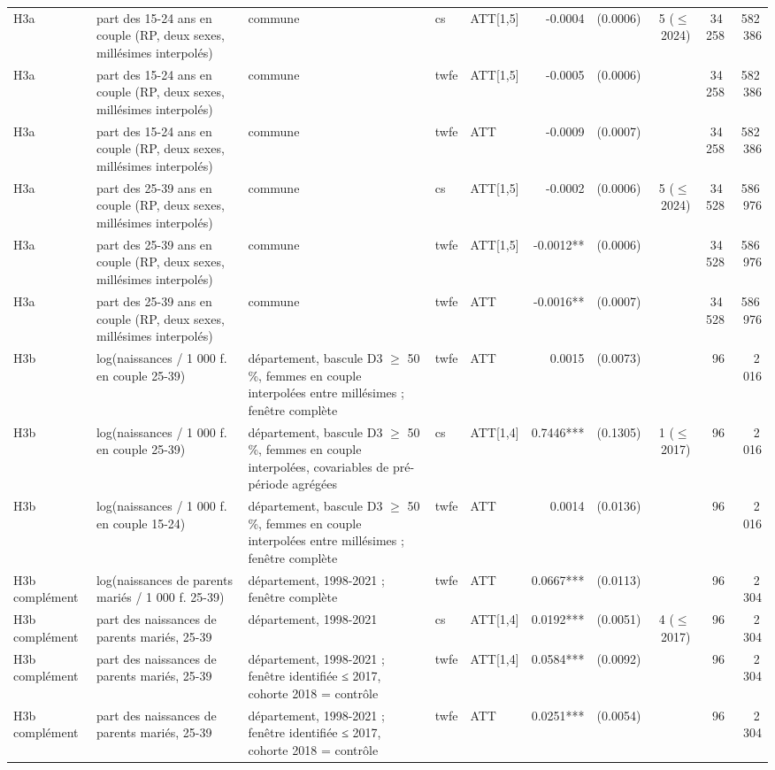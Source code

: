 \begin{table}
\begin{threeparttable}
\begin{tabular}{lp{3.8cm}p{4.6cm}lp{3.5cm}rrrrr}
H3a & part des 15-24 ans en couple (RP, deux sexes, millésimes interpolés) & commune & cs & ATT[1,5] & -0.0004 & (0.0006) & 5 ($\leq$ 2024) & 34\,258 & 582\,386 \\
H3a & part des 15-24 ans en couple (RP, deux sexes, millésimes interpolés) & commune & twfe & ATT[1,5] & -0.0005 & (0.0006) &  & 34\,258 & 582\,386 \\
H3a & part des 15-24 ans en couple (RP, deux sexes, millésimes interpolés) & commune & twfe & ATT & -0.0009 & (0.0007) &  & 34\,258 & 582\,386 \\
H3a & part des 25-39 ans en couple (RP, deux sexes, millésimes interpolés) & commune & cs & ATT[1,5] & -0.0002 & (0.0006) & 5 ($\leq$ 2024) & 34\,528 & 586\,976 \\
H3a & part des 25-39 ans en couple (RP, deux sexes, millésimes interpolés) & commune & twfe & ATT[1,5] & -0.0012** & (0.0006) &  & 34\,528 & 586\,976 \\
H3a & part des 25-39 ans en couple (RP, deux sexes, millésimes interpolés) & commune & twfe & ATT & -0.0016** & (0.0007) &  & 34\,528 & 586\,976 \\
H3b & log(naissances / 1 000 f. en couple 25-39) & département, bascule D3 $\geq$ 50 \%, femmes en couple interpolées entre millésimes ; fenêtre complète & twfe & ATT & 0.0015 & (0.0073) &  & 96 & 2\,016 \\
H3b & log(naissances / 1 000 f. en couple 25-39) & département, bascule D3 $\geq$ 50 \%, femmes en couple interpolées, covariables de pré-période agrégées & cs & ATT[1,4] & 0.7446*** & (0.1305) & 1 ($\leq$ 2017) & 96 & 2\,016 \\
H3b & log(naissances / 1 000 f. en couple 15-24) & département, bascule D3 $\geq$ 50 \%, femmes en couple interpolées entre millésimes ; fenêtre complète & twfe & ATT & 0.0014 & (0.0136) &  & 96 & 2\,016 \\
H3b complément & log(naissances de parents mariés / 1 000 f. 25-39) & département, 1998-2021 ; fenêtre complète & twfe & ATT & 0.0667*** & (0.0113) &  & 96 & 2\,304 \\
H3b complément & part des naissances de parents mariés, 25-39 & département, 1998-2021 & cs & ATT[1,4] & 0.0192*** & (0.0051) & 4 ($\leq$ 2017) & 96 & 2\,304 \\
H3b complément & part des naissances de parents mariés, 25-39 & département, 1998-2021 ; fenêtre identifiée ≤ 2017, cohorte 2018 = contrôle & twfe & ATT[1,4] & 0.0584*** & (0.0092) &  & 96 & 2\,304 \\
H3b complément & part des naissances de parents mariés, 25-39 & département, 1998-2021 ; fenêtre identifiée ≤ 2017, cohorte 2018 = contrôle & twfe & ATT & 0.0251*** & (0.0054) &  & 96 & 2\,304 \\

\end{tabular}
\end{threeparttable}
\end{table}
